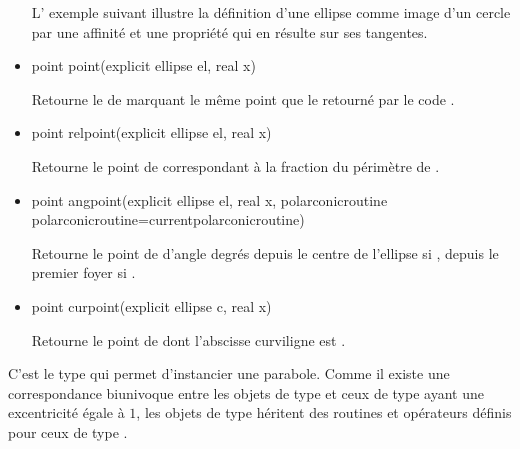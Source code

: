\documentclass[pdftex]{article}
\begin{document}
\begin{itemize}
  L' exemple suivant illustre la définition d'une ellipse comme image
  d'un cercle par une affinité et une propriété qui en résulte sur ses
  tangentes.
\item {}
  \begin{Vcolor}
    point point(explicit ellipse el, real x)
  \end{Vcolor}
  Retourne le  de  marquant le même
  point que le  retourné par le code
  .
\item {}
  \begin{Vcolor}
    point relpoint(explicit ellipse el, real x)
  \end{Vcolor}
  Retourne le point de  correspondant à la fraction 
  du périmètre de .
\item {}
  \begin{Vcolor}
    point angpoint(explicit ellipse el, real x,
    polarconicroutine polarconicroutine=currentpolarconicroutine)
  \end{Vcolor}
  Retourne le point de  d'angle  degrés
  depuis le centre de l'ellipse\linebreak
  si , depuis le premier foyer
  si .
\item {}
  \begin{Vcolor}
    point curpoint(explicit ellipse c, real x)
  \end{Vcolor}
  Retourne le point de  dont l'abscisse curviligne est .
\end{itemize}

C'est le type  qui permet d'instancier une parabole.
Comme il existe une correspondance biunivoque entre les objets de type
 et ceux de type  ayant une excentricité
égale à $1$, les objets de type  héritent des
routines et opérateurs définis pour ceux de type .
\end{document}
